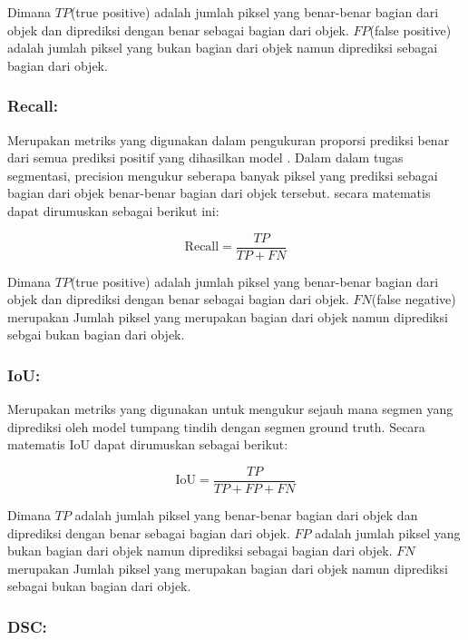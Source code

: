 \noindent Dimana \(TP\)(true positive) adalah jumlah piksel yang benar-benar bagian dari objek dan diprediksi dengan benar sebagai bagian dari objek. \(FP\)(false positive) adalah jumlah piksel yang bukan bagian dari objek namun diprediksi sebagai bagian dari objek.

\subsubsection{Recall:}
\noindent Merupakan metriks yang digunakan dalam pengukuran proporsi prediksi benar dari semua prediksi positif yang dihasilkan model \cite{jiang_iu-net_2023}.  Dalam dalam tugas segmentasi, precision mengukur seberapa banyak piksel yang prediksi sebagai bagian dari objek benar-benar bagian dari objek tersebut. secara matematis dapat dirumuskan sebagai berikut ini:

\begin{equation}
	\text{Recall} = \frac{TP}{TP + FN}
\end{equation}

\noindent Dimana \(TP\)(true positive) adalah jumlah piksel yang benar-benar bagian dari objek dan diprediksi dengan benar sebagai bagian dari objek. \(FN\)(false negative) merupakan Jumlah piksel yang merupakan bagian dari objek namun diprediksi sebgai bukan bagian dari objek.

\subsubsection{IoU:}
\noindent Merupakan metriks yang digunakan untuk mengukur sejauh mana segmen yang diprediksi oleh model tumpang tindih dengan segmen ground truth\cite{jiang_iu-net_2023}. Secara matematis IoU dapat dirumuskan sebagai berikut:

\begin{equation}
	\text{IoU} = \frac{TP}{TP + FP + FN}
\end{equation}

\noindent Dimana \(TP\) adalah jumlah piksel yang benar-benar bagian dari objek dan diprediksi dengan benar sebagai bagian dari objek. \(FP\) adalah jumlah piksel yang bukan bagian dari objek namun diprediksi sebagai bagian dari objek. \(FN\) merupakan Jumlah piksel yang merupakan bagian dari objek namun diprediksi sebagai bukan bagian dari objek. 

\subsubsection{DSC:}


